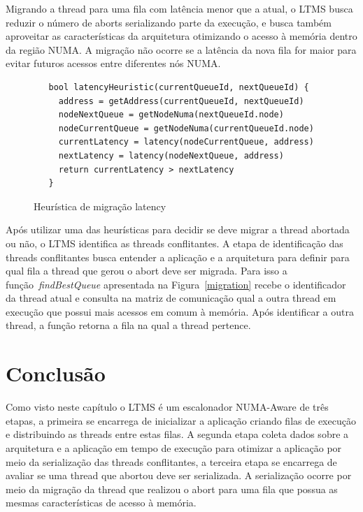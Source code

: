 \documentclass[diss,capa]{texufpel}
\begin{document}
Migrando a thread para uma fila com latência menor que a atual, o LTMS busca reduzir o número de aborts serializando parte da execução, e busca também aproveitar as características da arquitetura otimizando o acesso à memória dentro da região NUMA. A migração não ocorre se a latência da nova fila for maior para evitar futuros acessos entre diferentes nós NUMA.

\begin{figure}[htbp]
 \centering
 \begin{lstlisting}
   bool latencyHeuristic(currentQueueId, nextQueueId) {
     address = getAddress(currentQueueId, nextQueueId)
     nodeNextQueue = getNodeNuma(nextQueueId.node)
     nodeCurrentQueue = getNodeNuma(currentQueueId.node)
     currentLatency = latency(nodeCurrentQueue, address)
     nextLatency = latency(nodeNextQueue, address)
     return currentLatency > nextLatency
   }
 \end{lstlisting}
 \caption{Heurística de migração latency}
\label{latency}
\end{figure}

Após utilizar uma das heurísticas para decidir se deve migrar a thread abortada ou não, o LTMS identifica as threads conflitantes. A etapa de identificação das threads conflitantes busca entender a aplicação e a arquitetura para definir para qual fila a thread que gerou o abort deve ser migrada. Para isso a função~\emph{findBestQueue} apresentada na Figura~\ref{migration} recebe o identificador da thread atual e consulta na matriz de comunicação qual a outra thread em execução que possui mais acessos em comum à memória. Após identificar a outra thread, a função retorna a fila na qual a thread pertence.

\section{Conclusão}

Como visto neste capítulo o LTMS é um escalonador NUMA-Aware de três etapas, a primeira se encarrega de inicializar a aplicação criando filas de execução e distribuindo as threads entre estas filas. A segunda etapa coleta dados sobre a arquitetura e a aplicação em tempo de execução para otimizar a aplicação por meio da serialização das threads conflitantes, a terceira etapa se encarrega de avaliar se uma thread que abortou deve ser serializada. A serialização ocorre por meio da migração da thread que realizou o abort para uma fila que possua as mesmas características de acesso à memória.
\end{document}
